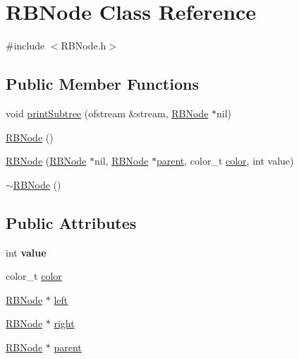 \hypertarget{class_r_b_node}{\section{R\+B\+Node Class Reference}
\label{class_r_b_node}
}


{\ttfamily \#include $<$R\+B\+Node.\+h$>$}

\subsection*{Public Member Functions}
\begin{DoxyCompactItemize}
\item 
void \hyperlink{class_r_b_node_a52363d92f3213a390c02dc797fad4669}{print\+Subtree} (ofstream \&stream, \hyperlink{class_r_b_node}{R\+B\+Node} $\ast$nil)
\item 
\hyperlink{class_r_b_node_a6c581adb50310ce3794f2e4613ac166c}{R\+B\+Node} ()
\item 
\hyperlink{class_r_b_node_a17af235c355263837391ca15addc5cb1}{R\+B\+Node} (\hyperlink{class_r_b_node}{R\+B\+Node} $\ast$nil, \hyperlink{class_r_b_node}{R\+B\+Node} $\ast$\hyperlink{class_r_b_node_a131e0d1a4f73d55e6b5ad282c6846612}{parent}, color\+\_\+t \hyperlink{class_r_b_node_aaa0b3a6a0ddb8fee8295b2a5bf876f07}{color}, int value)
\item 
\hyperlink{class_r_b_node_aca1bb7761c39ebd05b9051314df10843}{$\sim$\+R\+B\+Node} ()
\end{DoxyCompactItemize}
\subsection*{Public Attributes}
\begin{DoxyCompactItemize}
\item 
\hypertarget{class_r_b_node_a2e225cac48ba29539ae7a9048200bd89}{int {\bfseries value}}\label{class_r_b_node_a2e225cac48ba29539ae7a9048200bd89}

\item 
color\+\_\+t \hyperlink{class_r_b_node_aaa0b3a6a0ddb8fee8295b2a5bf876f07}{color}
\item 
\hyperlink{class_r_b_node}{R\+B\+Node} $\ast$ \hyperlink{class_r_b_node_a3345545f8a1678010bca11b5f7153a4a}{left}
\item 
\hyperlink{class_r_b_node}{R\+B\+Node} $\ast$ \hyperlink{class_r_b_node_af82826872827c548a5713eb84f264767}{right}
\item 
\hyperlink{class_r_b_node}{R\+B\+Node} $\ast$ \hyperlink{class_r_b_node_a131e0d1a4f73d55e6b5ad282c6846612}{parent}
\end{DoxyCompactItemize}
